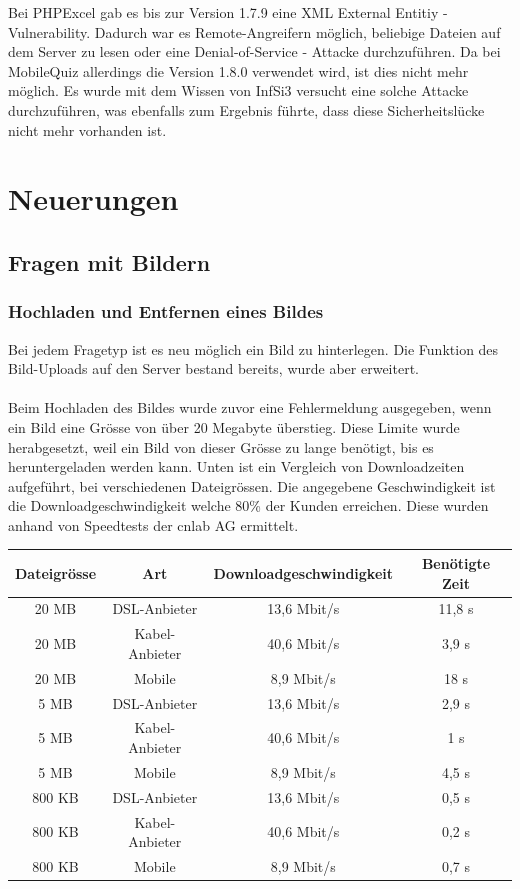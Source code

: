 Bei PHPExcel gab es bis zur Version 1.7.9 eine \gls{XML External Entitiy} - \gls{Vulnerability}. Dadurch war es Remote-Angreifern möglich, beliebige Dateien auf dem Server zu lesen oder eine Denial-of-Service - Attacke durchzuführen. \cite{cvedetails_phpexcel}
Da bei MobileQuiz allerdings die Version 1.8.0 verwendet wird, ist dies nicht mehr möglich. Es wurde mit dem Wissen von InfSi3 versucht eine solche Attacke durchzuführen, was ebenfalls zum Ergebnis führte, dass diese Sicherheitslücke nicht mehr vorhanden ist.

\section{Neuerungen}

\subsection{Fragen mit Bildern}

\subsubsection{Hochladen und Entfernen eines Bildes}
Bei jedem Fragetyp ist es neu möglich ein Bild zu hinterlegen. Die Funktion des Bild-Uploads auf den Server bestand bereits, wurde aber erweitert.
\\
\\
Beim Hochladen des Bildes wurde zuvor eine Fehlermeldung ausgegeben, wenn ein Bild eine Grösse von über 20 Megabyte überstieg. Diese Limite wurde herabgesetzt, weil ein Bild von dieser Grösse zu lange benötigt, bis es heruntergeladen werden kann. Unten ist ein Vergleich von Downloadzeiten aufgeführt, bei verschiedenen Dateigrössen. Die angegebene Geschwindigkeit ist die Downloadgeschwindigkeit welche 80\% der Kunden erreichen. Diese wurden anhand von Speedtests der cnlab AG \cite{cnlab_speedtest} ermittelt. \\


\begin{tabular}{|c|c|c|c|}
	\hline 
	Dateigrösse & Art & Downloadgeschwindigkeit & Benötigte Zeit \\ 
	\hline 
	20 MB & DSL-Anbieter & 13,6 Mbit/s & 11,8 s \\ 
	\hline 
	20 MB & Kabel-Anbieter & 40,6 Mbit/s & 3,9 s \\ 
	\hline 
	20 MB & Mobile & 8,9 Mbit/s & 18 s \\ 
	\hline 
	5 MB & DSL-Anbieter & 13,6 Mbit/s & 2,9 s \\ 
	\hline 
	5 MB & Kabel-Anbieter & 40,6 Mbit/s & 1 s \\ 
	\hline 
	5 MB & Mobile & 8,9 Mbit/s & 4,5 s \\ 
	\hline 
	800 KB & DSL-Anbieter & 13,6 Mbit/s & 0,5 s \\ 
	\hline 
	800 KB & Kabel-Anbieter & 40,6 Mbit/s & 0,2 s \\ 
	\hline 
	800 KB & Mobile & 8,9 Mbit/s & 0,7 s \\ 
	\hline 
\end{tabular}\\


